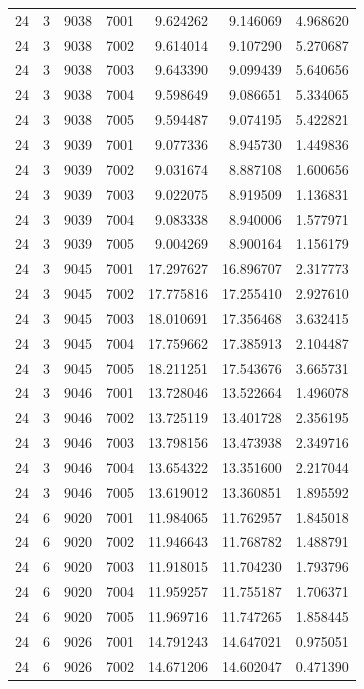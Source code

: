 \begin{table}
\begin{tabular}{rrrrrrr}
24 & 3 & 9038 & 7001 & 9.624262 & 9.146069 & 4.968620 \\
24 & 3 & 9038 & 7002 & 9.614014 & 9.107290 & 5.270687 \\
24 & 3 & 9038 & 7003 & 9.643390 & 9.099439 & 5.640656 \\
24 & 3 & 9038 & 7004 & 9.598649 & 9.086651 & 5.334065 \\
24 & 3 & 9038 & 7005 & 9.594487 & 9.074195 & 5.422821 \\
24 & 3 & 9039 & 7001 & 9.077336 & 8.945730 & 1.449836 \\
24 & 3 & 9039 & 7002 & 9.031674 & 8.887108 & 1.600656 \\
24 & 3 & 9039 & 7003 & 9.022075 & 8.919509 & 1.136831 \\
24 & 3 & 9039 & 7004 & 9.083338 & 8.940006 & 1.577971 \\
24 & 3 & 9039 & 7005 & 9.004269 & 8.900164 & 1.156179 \\
24 & 3 & 9045 & 7001 & 17.297627 & 16.896707 & 2.317773 \\
24 & 3 & 9045 & 7002 & 17.775816 & 17.255410 & 2.927610 \\
24 & 3 & 9045 & 7003 & 18.010691 & 17.356468 & 3.632415 \\
24 & 3 & 9045 & 7004 & 17.759662 & 17.385913 & 2.104487 \\
24 & 3 & 9045 & 7005 & 18.211251 & 17.543676 & 3.665731 \\
24 & 3 & 9046 & 7001 & 13.728046 & 13.522664 & 1.496078 \\
24 & 3 & 9046 & 7002 & 13.725119 & 13.401728 & 2.356195 \\
24 & 3 & 9046 & 7003 & 13.798156 & 13.473938 & 2.349716 \\
24 & 3 & 9046 & 7004 & 13.654322 & 13.351600 & 2.217044 \\
24 & 3 & 9046 & 7005 & 13.619012 & 13.360851 & 1.895592 \\
24 & 6 & 9020 & 7001 & 11.984065 & 11.762957 & 1.845018 \\
24 & 6 & 9020 & 7002 & 11.946643 & 11.768782 & 1.488791 \\
24 & 6 & 9020 & 7003 & 11.918015 & 11.704230 & 1.793796 \\
24 & 6 & 9020 & 7004 & 11.959257 & 11.755187 & 1.706371 \\
24 & 6 & 9020 & 7005 & 11.969716 & 11.747265 & 1.858445 \\
24 & 6 & 9026 & 7001 & 14.791243 & 14.647021 & 0.975051 \\
24 & 6 & 9026 & 7002 & 14.671206 & 14.602047 & 0.471390 \\

\end{tabular}
\end{table}
